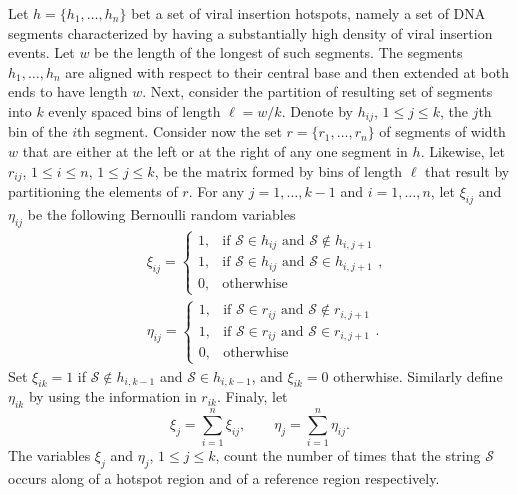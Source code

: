 \documentclass{bioinfo}
\begin{document}
Let $h = \{h_1, \ldots, h_n\}$ bet a set of viral insertion hotspots, namely a set of DNA segments characterized by having a substantially high density of viral insertion events. Let $w$ be the length of the longest of such segments. The segments $h_1, \ldots, h_n$ are aligned with respect to their central base and then extended at both ends to have length $w$. Next, consider the partition of resulting set of segments into $k$ evenly spaced bins of length $\ell = w/k$. Denote by $h_{ij}$, $1 \leq j \leq k$, the $j$th bin of the $i$th segment. Consider now the set $r= \{r_1, \ldots, r_n\}$ of segments of width $w$ that are either at the left or at the right of any one segment in $h$. Likewise, let $r_{ij}$, $1\leq i \leq n$, $1 \leq j \leq k$, be the matrix formed by bins of length $\ell$ that result by partitioning  the elements of $r$. For any $j = 1, \ldots, k-1$ and $i = 1, \ldots, n$, let $\xi_{ij}$ and $\eta_{ij}$ be the following Bernoulli random variables
\begin{align*}
   &\xi_{ij} = %
    \begin{cases}
     1, &\text{if } \mathcal S \in h_{ij} \text{ and } \mathcal S 
     \notin h_{i,j+1}\\
     1, &\text{if } \mathcal S \in h_{ij} \text{ and } \mathcal S 
     \in h_{i,j+1}\\
     0, &\text{otherwhise}
    \end{cases},\\
   &\eta_{ij} = %
    \begin{cases}
     1, &\text{if } \mathcal S \in r_{ij} \text{ and } \mathcal S 
     \notin r_{i,j+1}\\
     1, &\text{if } \mathcal S \in r_{ij} \text{ and } \mathcal S 
     \in r_{i,j+1}\\
     0, &\text{otherwhise}
    \end{cases}.
\end{align*}
Set $\xi_{ik}  = 1$ if $\mathcal S \notin h_{i,k-1}$ and $\mathcal S \in h_{i,k-1}$, and $\xi_{ik} = 0$ otherwhise. Similarly define $\eta_{ik}$ by using the information in $r_{ik}$. Finaly, let
\[
   \xi_j = \sum_{i=1}^n \xi_{ij}, \qquad 
   \eta_j = \sum_{i=1}^n \eta_{ij}.
\]
The variables $\xi_j$ and $\eta_j$, $1 \leq j \leq k$, count the number of times that the string $\mathcal S$ occurs along of a hotspot region and of a reference region respectively. 
\end{document}
